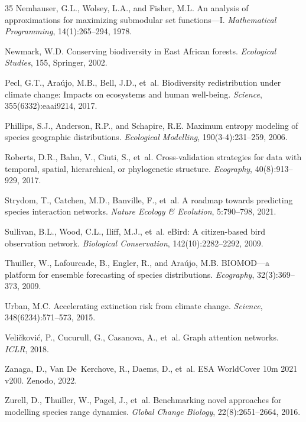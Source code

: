 \documentclass[11pt,a4paper]{article}
\begin{document}
\begin{thebibliography}{35}
Nemhauser, G.L., Wolsey, L.A., and Fisher, M.L.
\newblock An analysis of approximations for maximizing submodular set
  functions---I.
\newblock \emph{Mathematical Programming}, 14(1):265--294, 1978.

Newmark, W.D.
\newblock Conserving biodiversity in East African forests.
\newblock \emph{Ecological Studies}, 155, Springer, 2002.

Pecl, G.T., Ara{\'u}jo, M.B., Bell, J.D., et~al.
\newblock Biodiversity redistribution under climate change: Impacts on
  ecosystems and human well-being.
\newblock \emph{Science}, 355(6332):eaai9214, 2017.

Phillips, S.J., Anderson, R.P., and Schapire, R.E.
\newblock Maximum entropy modeling of species geographic distributions.
\newblock \emph{Ecological Modelling}, 190(3-4):231--259, 2006.

Roberts, D.R., Bahn, V., Ciuti, S., et~al.
\newblock Cross-validation strategies for data with temporal, spatial,
  hierarchical, or phylogenetic structure.
\newblock \emph{Ecography}, 40(8):913--929, 2017.

Strydom, T., Catchen, M.D., Banville, F., et~al.
\newblock A roadmap towards predicting species interaction networks.
\newblock \emph{Nature Ecology \& Evolution}, 5:790--798, 2021.

Sullivan, B.L., Wood, C.L., Iliff, M.J., et~al.
\newblock eBird: A citizen-based bird observation network.
\newblock \emph{Biological Conservation}, 142(10):2282--2292, 2009.

Thuiller, W., Lafourcade, B., Engler, R., and Ara{\'u}jo, M.B.
\newblock BIOMOD---a platform for ensemble forecasting of species distributions.
\newblock \emph{Ecography}, 32(3):369--373, 2009.

Urban, M.C.
\newblock Accelerating extinction risk from climate change.
\newblock \emph{Science}, 348(6234):571--573, 2015.

Veli{\v{c}}kovi{\'c}, P., Cucurull, G., Casanova, A., et~al.
\newblock Graph attention networks.
\newblock \emph{ICLR}, 2018.

Zanaga, D., Van De~Kerchove, R., Daems, D., et~al.
\newblock ESA WorldCover 10m 2021 v200.
\newblock Zenodo, 2022.

Zurell, D., Thuiller, W., Pagel, J., et~al.
\newblock Benchmarking novel approaches for modelling species range dynamics.
\newblock \emph{Global Change Biology}, 22(8):2651--2664, 2016.

\end{thebibliography}
\end{document}
